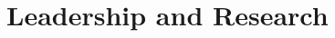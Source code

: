 \documentclass[10pt]{article} %
\begin{document}

%


\section{Leadership and Research}
\end{document}
